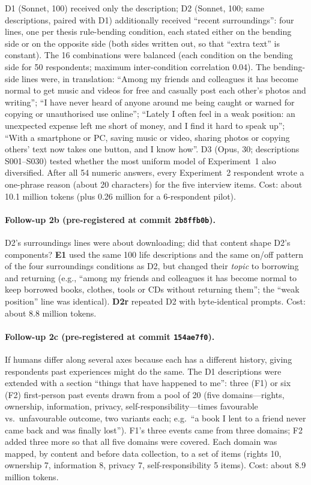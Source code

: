 \documentclass[11pt]{article}
\begin{document}
D1 (Sonnet, 100) received only the description; D2 (Sonnet, 100; same descriptions, paired with D1) additionally received ``recent surroundings'': four lines, one per thesis rule-bending condition, each stated either on the bending side or on the opposite side (both sides written out, so that ``extra text'' is constant). The 16 combinations were balanced (each condition on the bending side for 50 respondents; maximum inter-condition correlation 0.04). The bending-side lines were, in translation: ``Among my friends and colleagues it has become normal to get music and videos for free and casually post each other's photos and writing''; ``I have never heard of anyone around me being caught or warned for copying or unauthorised use online''; ``Lately I often feel in a weak position: an unexpected expense left me short of money, and I find it hard to speak up''; ``With a smartphone or PC, saving music or video, sharing photos or copying others' text now takes one button, and I know how''. D3 (Opus, 30; descriptions S001--S030) tested whether the most uniform model of Experiment~1 also diversified. After all 54 numeric answers, every Experiment~2 respondent wrote a one-phrase reason (about 20 characters) for the five interview items. Cost: about 10.1 million tokens (plus 0.26 million for a 6-respondent pilot).

\paragraph{Follow-up 2b (pre-registered at commit \texttt{2b8ffb0b}).}
D2's surroundings lines were about downloading; did that content shape D2's components? \textbf{E1} used the same 100 life descriptions and the same on/off pattern of the four surroundings conditions as D2, but changed their \emph{topic} to borrowing and returning (e.g., ``among my friends and colleagues it has become normal to keep borrowed books, clothes, tools or CDs without returning them''; the ``weak position'' line was identical). \textbf{D2r} repeated D2 with byte-identical prompts. Cost: about 8.8 million tokens.

\paragraph{Follow-up 2c (pre-registered at commit \texttt{154ae7f0}).}
If humans differ along several axes because each has a different history, giving respondents past experiences might do the same. The D1 descriptions were extended with a section ``things that have happened to me'': three (F1) or six (F2) first-person past events drawn from a pool of 20 (five domains---rights, ownership, information, privacy, self-responsibility---times favourable vs.\ unfavourable outcome, two variants each; e.g.\ ``a book I lent to a friend never came back and was finally lost''). F1's three events came from three domains; F2 added three more so that all five domains were covered. Each domain was mapped, by content and before data collection, to a set of items (rights 10, ownership 7, information 8, privacy 7, self-responsibility 5 items). Cost: about 8.9 million tokens.
\end{document}
